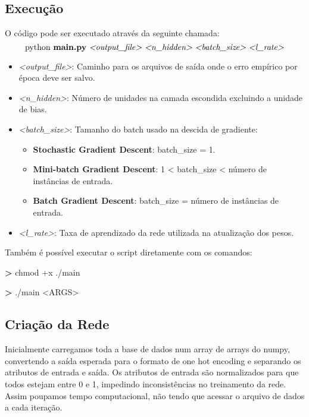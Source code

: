 \documentclass[a4paper, 11pt]{article}
\begin{document}
\subsection{Execução}
O código pode ser executado através da seguinte chamada:
\begin{equation*}
\text{python \textbf{main.py} \textit{<output\_file> <n\_hidden> <batch\_size> <l\_rate>}}
\end{equation*}

\begin{itemize}
  \item \textit{<output\_file>}: Caminho para os arquivos de saída onde o erro empírico por época deve ser salvo.
  \item \textit{<n\_hidden>}: Número de unidades na camada escondida excluindo a unidade de bias.
  \item \textit{<batch\_size>}: Tamanho do batch usado na descida de gradiente:
  	\begin{itemize}
        \item \textbf{Stochastic Gradient Descent}: batch\_size = 1.
        \item \textbf{Mini-batch Gradient Descent}: 1 < batch\_size < número de instâncias de entrada.
        \item \textbf{Batch Gradient Descent}: batch\_size = número de instâncias de entrada.
    \end{itemize}
  \item \textit{<l\_rate>}: Taxa de aprendizado da rede utilizada na atualização dos pesos.
\end{itemize}
 
Também é possível executar o script diretamente com os comandos: \par
\textbf{>} chmod +x ./main \par
\textbf{>} ./main <ARGS>
				


\subsection{Criação da Rede}
Inicialmente carregamos toda a base de dados num array de arrays do numpy, convertendo a saída esperada para o formato de one hot encoding e separando os atributos de entrada e saída. Os atributos de entrada são normalizados para que todos estejam entre 0 e 1, impedindo inconsistências no treinamento da rede. Assim poupamos tempo computacional, não tendo que acessar o arquivo de dados a cada iteração.
\end{document}
